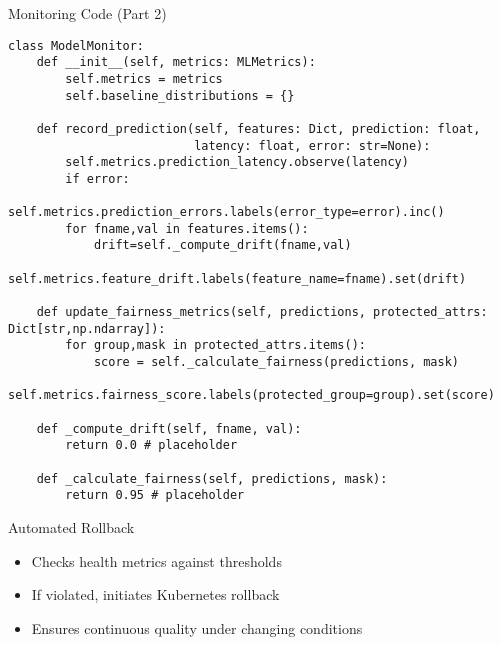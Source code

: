 \documentclass[aspectratio=169]{beamer}
\begin{document}

\begin{frame}[fragile]{Monitoring Code (Part 2)}
\begin{verbatim}
class ModelMonitor:
    def __init__(self, metrics: MLMetrics):
        self.metrics = metrics
        self.baseline_distributions = {}

    def record_prediction(self, features: Dict, prediction: float,
                          latency: float, error: str=None):
        self.metrics.prediction_latency.observe(latency)
        if error:
            self.metrics.prediction_errors.labels(error_type=error).inc()
        for fname,val in features.items():
            drift=self._compute_drift(fname,val)
            self.metrics.feature_drift.labels(feature_name=fname).set(drift)

    def update_fairness_metrics(self, predictions, protected_attrs: Dict[str,np.ndarray]):
        for group,mask in protected_attrs.items():
            score = self._calculate_fairness(predictions, mask)
            self.metrics.fairness_score.labels(protected_group=group).set(score)

    def _compute_drift(self, fname, val):
        return 0.0 # placeholder

    def _calculate_fairness(self, predictions, mask):
        return 0.95 # placeholder
\end{verbatim}
\end{frame}


\begin{frame}{Automated Rollback}

\begin{itemize}
\item Checks health metrics against thresholds
\item If violated, initiates Kubernetes rollback
\item Ensures continuous quality under changing conditions
\end{itemize}
\end{frame}
\end{document}

